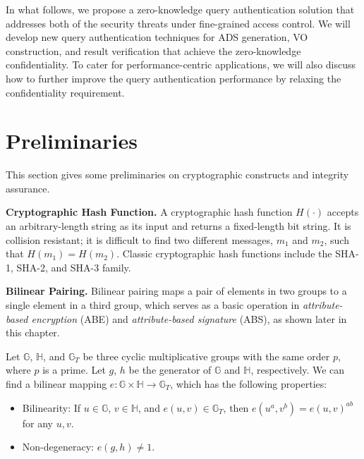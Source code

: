 In what follows, we propose a zero-knowledge query authentication solution that addresses both of the security threats under fine-grained access control. We will develop new query authentication techniques for ADS generation, VO construction, and result verification that achieve the zero-knowledge confidentiality. To cater for performance-centric applications, we will also discuss how to further improve the query authentication performance by relaxing the confidentiality requirement.

\section{Preliminaries}\label{sec:access-control:prelim}

This section gives some preliminaries on cryptographic constructs and integrity assurance.

\textbf{Cryptographic Hash Function.}
A cryptographic hash function $H(\cdot)$ accepts an arbitrary-length string as its input and returns a fixed-length bit string. It is collision resistant; it is difficult to find two different messages, $m_1$ and $m_2$, such that $H(m_1) = H(m_2)$. Classic cryptographic hash functions include the SHA-1, SHA-2, and SHA-3 family.

\textbf{Bilinear Pairing.}
Bilinear pairing maps a pair of elements in two groups to a single element in a third group, which serves as a basic operation in \emph{attribute-based encryption} (ABE) and \emph{attribute-based signature} (ABS), as shown later in this chapter.

Let $\mathbb{G}$, $\mathbb{H}$, and $\mathbb{G}_T$ be three cyclic multiplicative groups with the same order $p$, where $p$ is a prime. Let $g$, $h$ be the generator of $\mathbb{G}$ and $\mathbb{H}$, respectively. We can find a bilinear mapping $e: \mathbb{G} \times \mathbb{H} \rightarrow \mathbb{G}_T$, which has the following properties:
\begin{itemize}
  \item \textsf{Bilinearity}: If $u \in \mathbb{G}$, $v \in \mathbb{H}$, and $e(u,v)\in\mathbb{G}_T$, then $e(u^a, v^b) = {e(u, v)}^{ab}$ for any $u,v$.
  \item \textsf{Non-degeneracy}: $e(g, h) \neq 1$.
\end{itemize}


